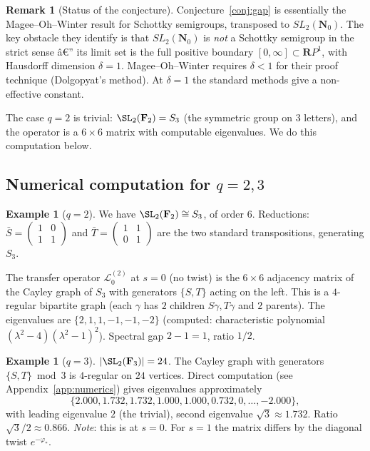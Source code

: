 ﻿\documentclass[11pt]{article}
\theoremstyle{definition}
\newtheorem{remark}[theorem]{Remark}
\newtheorem{example}[theorem]{Example}
\newcommand{\Nz}{\mathbf{N}_0}
\newcommand{\F}{\mathbf{F}}
\newcommand{\SLNz}{SL_2(\Nz)}
\newcommand{\Lop}{\mathcal{L}}
\begin{document}
\begin{remark}[Status of the conjecture]
Conjecture~\ref{conj:gap} is essentially the Magee--Oh--Winter result \cite{magee-oh-winter} for Schottky semigroups, transposed to $\SLNz$. The key obstacle they identify is that $\SLNz$ is \emph{not} a Schottky semigroup in the strict sense â€” its limit set is the full positive boundary $[0,\infty]\subset\mathbf{R}P^1$, with Hausdorff dimension $\delta=1$. Magee--Oh--Winter requires $\delta<1$ for their proof technique (Dolgopyat's method). At $\delta=1$ the standard methods give a non-effective constant.

The case $q=2$ is trivial: $\SL_2(\F_2)=S_3$ (the symmetric group on $3$ letters), and the operator is a $6\times 6$ matrix with computable eigenvalues. We do this computation below.
\end{remark}

\subsection{Numerical computation for $q=2,3$}\label{sec:numerics-q2q3}

\begin{example}[$q=2$]\label{ex:q2}
We have $\SL_2(\F_2)\cong S_3$, of order $6$. Reductions: $\bar S=\begin{pmatrix}1&0\\1&1\end{pmatrix}$ and $\bar T=\begin{pmatrix}1&1\\0&1\end{pmatrix}$ are the two standard transpositions, generating $S_3$.

The transfer operator $\Lop_0^{(2)}$ at $s=0$ (no twist) is the $6\times 6$ adjacency matrix of the Cayley graph of $S_3$ with generators $\{S,T\}$ acting on the left. This is a $4$-regular bipartite graph (each $\gamma$ has $2$ children $S\gamma,T\gamma$ and $2$ parents). The eigenvalues are $\{2,1,1,-1,-1,-2\}$ (computed: characteristic polynomial $(\lambda^2-4)(\lambda^2-1)^2$). Spectral gap $2-1=1$, ratio $1/2$.
\end{example}

\begin{example}[$q=3$]\label{ex:q3}
$|\SL_2(\F_3)|=24$. The Cayley graph with generators $\{S,T\}\bmod 3$ is $4$-regular on $24$ vertices. Direct computation (see Appendix~\ref{app:numerics}) gives eigenvalues approximately
\[
\{2.000, 1.732, 1.732, 1.000, 1.000, 0.732, 0, \ldots, -2.000\},
\]
with leading eigenvalue $2$ (the trivial), second eigenvalue $\sqrt{3}\approx 1.732$. Ratio $\sqrt{3}/2\approx 0.866$. \emph{Note}: this is at $s=0$. For $s=1$ the matrix differs by the diagonal twist $e^{-\varphi_*}$.
\end{example}
\end{document}
